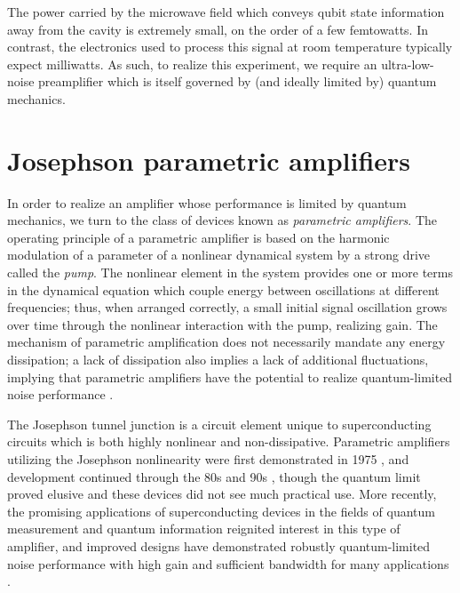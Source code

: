 The power carried by the microwave field which conveys qubit state information away from the cavity is extremely small, on the order of a few femtowatts. In contrast, the electronics used to process this signal at room temperature typically expect milliwatts.  As such, to realize this experiment, we require an ultra-low-noise preamplifier which is itself governed by (and ideally limited by) quantum mechanics.

\section{Josephson parametric amplifiers}

In order to realize an amplifier whose performance is limited by quantum mechanics, we turn to the class of devices known as \textit{parametric amplifiers}.  The operating principle of a parametric amplifier is based on the harmonic modulation of a parameter of a nonlinear dynamical system by a strong drive called the \textit{pump}.  The nonlinear element in the system provides one or more terms in the dynamical equation which couple energy between oscillations at different frequencies; thus, when arranged correctly, a small initial signal oscillation grows over time through the nonlinear interaction with the pump, realizing gain.  The mechanism of parametric amplification does not necessarily mandate any energy dissipation; a lack of dissipation also implies a lack of additional fluctuations, implying that parametric amplifiers have the potential to realize quantum-limited noise performance \cite{clerk_revmod}.

The Josephson tunnel junction is a circuit element unique to superconducting circuits which is both highly nonlinear and non-dissipative.  Parametric amplifiers utilizing the Josephson nonlinearity were first demonstrated in 1975 \cite{Feldman1975}, and development continued through the 80s and 90s \cite{1060904,1063665,Yurke1989,Yurke:1996ys}, though the quantum limit proved elusive and these devices did not see much practical use.  More recently, the promising applications of superconducting devices in the fields of quantum measurement and quantum information reignited interest in this type of amplifier, and improved designs have demonstrated robustly quantum-limited noise performance with high gain and sufficient bandwidth for many applications \cite{Castellanos-Beltran2008,JPCNature,Hatridge:2011zr}.

